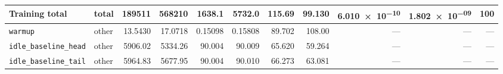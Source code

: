 \begin{table}[tbp]
{\begin{tabular}{@{}llrrrrrrrrr@{}}
      \midrule
      Training total & total & \num{189511} & \num{568210} & \num{1638.1} & \num{5732.0} & \num{115.69} & \num{99.130} & \num{6.010e-10} & \num{1.802e-09} & \num{100} \\
      \midrule
      \texttt{warmup} & other & \num{13.5430} & \num{17.0718} & \num{0.15098} & \num{0.15808} & \num{89.702} & \num{108.00} & --- & --- & --- \\
      \texttt{idle\_\allowbreak baseline\_\allowbreak head} & other & \num{5906.02} & \num{5334.26} & \num{90.004} & \num{90.009} & \num{65.620} & \num{59.264} & --- & --- & --- \\
      \texttt{idle\_\allowbreak baseline\_\allowbreak tail} & other & \num{5964.83} & \num{5677.95} & \num{90.004} & \num{90.010} & \num{66.273} & \num{63.081} & --- & --- & --- \\
      \bottomrule
    \end{tabular}}
\end{table}
